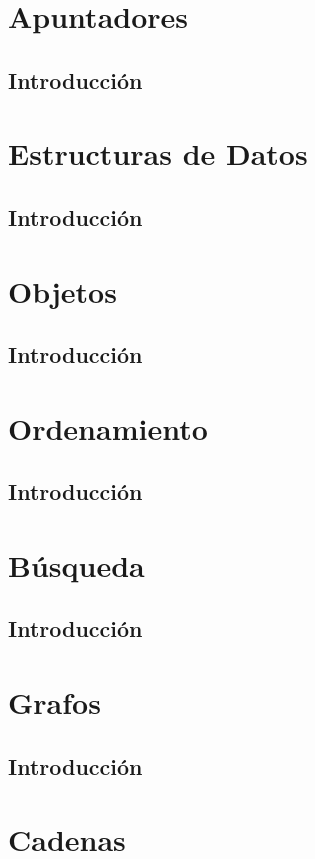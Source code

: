 \documentclass{beamer}
\begin{document}
\section{Apuntadores}
\subsection{Introducci\'on}

\section{Estructuras de Datos}
\subsection{Introducci\'on}

\section{Objetos}
\subsection{Introducci\'on}

\section{Ordenamiento}
\subsection{Introducci\'on}

\section{B\'usqueda}
\subsection{Introducci\'on}

\section{Grafos}
\subsection{Introducci\'on}

\section{Cadenas}
\end{document}
